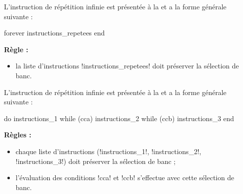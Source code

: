 
L'instruction de répétition infinie est présentée à la  et a la forme générale suivante :

\begin{piccolo}
forever
  instructions_repetees
end
\end{piccolo}

\textbf{Règle :}
\begin{itemize}
  \item la liste d'instructions \pic!instructions_repetees! doit préserver la sélection de banc.
\end{itemize}




L'instruction de répétition infinie est présentée à la  et a la forme générale suivante :

\begin{piccolo}
do
  instructions_1
while (cca)
  instructions_2
while (ccb)
  instructions_3
end
\end{piccolo}

\textbf{Règles :}
\begin{itemize}
  \item chaque liste d'instructions (\pic!instructions_1!, \pic!instructions_2!, \pic!instructions_3!) doit préserver la sélection de banc ;
  \item l'évaluation des conditions \pic!cca! et \pic!ccb! s'effectue avec cette sélection de banc.
\end{itemize}
